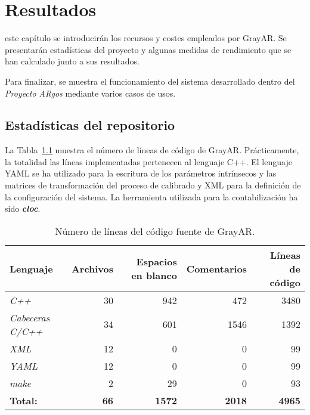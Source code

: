\chapter{Resultados}
\label{chap:resultados}

 este capítulo se introducirán los recursos y costes empleados por GrayAR. Se presentarán estadísticas del proyecto y algunas medidas de rendimiento que se han calculado junto a sus
resultados. %

Para finalizar, se muestra el funcionamiento del sistema desarrollado dentro del \textit{Proyecto ARgos} mediante varios casos de usos.  

\section{Estadísticas del repositorio}
La Tabla~\ref{tab:number_of_lines} muestra el número de líneas de código de GrayAR. Prácticamente, la totalidad las líneas implementadas pertenecen al lenguaje C++. El lenguaje YAML se ha utilizado para la escritura de los parámetros intrínsecos y las matrices de transformación del proceso de calibrado y XML para la definición de la configuración del sistema. La herramienta utilizada para la contabilización ha sido \textbf{\textit{cloc}}.

\begin{table}[h]
  \centering
  \begin{tabular}{|l|r|r|r|r|}
    \hline
    \textbf{Lenguaje} & \textbf{Archivos} & \textbf{Espacios en blanco} & \textbf{Comentarios} & \textbf{Líneas de código} \\
    \hline
    \textit{C++} & 30 & 942 & 472 & 3480 \\
    \hline
    \textit{Cabeceras C/C++} & 34 & 601 & 1546 & 1392 \\
    \hline
    \textit{XML} & 12 & 0 & 0 & 99 \\
    \hline
    \textit{YAML} & 12 & 0 & 0 & 99 \\
    \hline
    \textit{make} & 2 & 29 & 0 & 93 \\
    \hline
    \textbf{Total:} & \textbf{66} & \textbf{1572} & \textbf{2018} & \textbf{4965} \\
    \hline
  \end{tabular}
  \caption{Número de líneas del código fuente de GrayAR.}
  \label{tab:number_of_lines}
\end{table}

